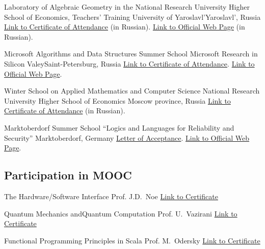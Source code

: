 \documentclass[11pt,a4paper]{moderncv}   %
\newcommand{\myhref}[2]{\textcolor{blue}{\href{#1}{#2}}}
\begin{document}
%
    {Laboratory of Algebraic Geometry in the National Research University Higher School of Economics, Teachers' Training University of Yaroslavl'}{Yaroslavl', Russia}%
    {}%
    {\myhref{http://mmcs.sfedu.ru/~ulysses/Papers/Trainings/2011-Yaroslavl.jpg}{Link to Certificate of Attendance} (in Russian). \myhref{http://bogomolov-lab.ru/SHKOLA/}{Link to Official Web Page} (in Russian).}

%
    {Microsoft Algorithms and Data Structures Summer School}%
    {Microsoft Research in Silicon Valey}{Saint-Petersburg, Russia}{}%
    {\myhref{http://mmcs.sfedu.ru/~ulysses/Papers/Trainings/2010-MIDAS-participation.jpg}{Link to Certificate of Attendance}. \myhref{http://logic.pdmi.ras.ru/midas/en/about}{Link to Official Web Page}.}

%
    {Winter School on Applied Mathematics and Computer Science}%
    {National Research University Higher School of Economics}%
    {Moscow province, Russia}{}%
    {\myhref{http://mmcs.sfedu.ru/~ulysses/Papers/Trainings/2010-HSE-math-school-participation.jpg}{Link to Certificate of Attendance} (in Russian).}

%
    {Marktoberdorf Summer School “Logics and Languages for Reliability and Security”}%
    {}{Marktoberdorf, Germany}{}%
    {\myhref{http://mmcs.sfedu.ru/~ulysses/Papers/Trainings/2009-Marktoberdorf-adoption.jpg}{Letter of Acceptance}. \myhref{http://asimod.in.tum.de/2009/index.shtml}{Link to Official Web Page}.}


\subsection{Participation in MOOC}
	{The Hardware/Software Interface}
	{Prof. J.D.~Noe}{}{}
	{\myhref{http://mmcs.sfedu.ru/~ulysses/Edu/coursera/hwsw.pdf}
	{Link to Certificate}}

	{Quantum Mechanics andQuantum Computation}
	{Prof. U.~Vazirani}{}{}
	{\myhref{http://mmcs.sfedu.ru/~ulysses/Edu/coursera/qmqc.pdf}
	{Link to Certificate}}

	{Functional Programming Principles
in Scala}
	{Prof. M.~Odersky}{}{}
	{\myhref{http://mmcs.sfedu.ru/~ulysses/Edu/coursera/progfun.pdf}
	{Link to Certificate}}
\end{document}

